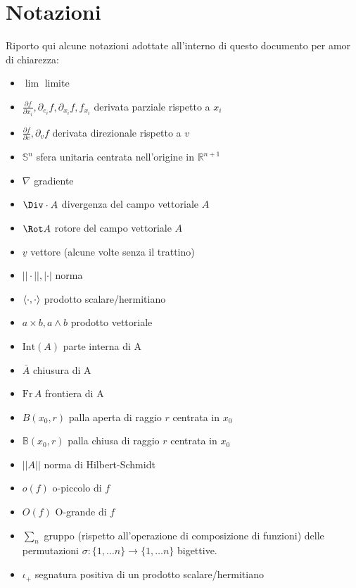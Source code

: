 \documentclass[12pt, twoside, italian]{book}
\begin{document}
	\chapter*{Notazioni}
	\pagestyle{empty}
	\thispagestyle{empty}
	\pagestyle{fancy}

	Riporto qui alcune notazioni adottate all'interno di questo documento per amor di chiarezza:
	\begin{itemize}[label=\hspace{-0.5em}]
		\item $\lim$ limite		
		\item $\frac{\partial f}{\partial x_i}, \partial_{e_i} f, \partial_{x_i} f, f_{x_i}$ derivata parziale rispetto a $x_i$
		\item $\frac{\partial f}{\partial v}, \partial_v f$ derivata direzionale rispetto a $v$
		\item $\mathbb{S}^{n}$ sfera unitaria centrata nell'origine in $\mathbb{R}^{n+1}$
		\item $\nabla$ gradiente
		\item $\Div \cdot A$ divergenza del campo vettoriale $A$
		\item $\Rot A$ rotore del campo vettoriale $A$
		\item $\underline{v}$ vettore (alcune volte senza il trattino)
		\item $||\cdot||, |\cdot|$ norma
		\item $\langle \cdot, \cdot \rangle$ prodotto scalare/hermitiano
		\item $a \times b, a \wedge b$ prodotto vettoriale
		\item $\text{Int}(A)$ parte interna di A
		\item $\bar{A}$ chiusura di A
		\item $\text{Fr} \, A$ frontiera di A
		\item $B(x_0, r)$ palla aperta di raggio $r$ centrata in $x_0$
		\item $\mathbb{B}(x_0, r)$ palla chiusa di raggio $r$ centrata in $x_0$
		\item $|| A ||$ norma di Hilbert-Schmidt
		\item $o(f)$ o-piccolo di $f$
		\item $O(f)$ O-grande di $f$
		\item $\sum_{n}$ gruppo (rispetto all'operazione di composizione di funzioni) delle permutazioni $\sigma: \{1, \ldots n \} \to \{1, \ldots n \}$ bigettive.
		\item $\iota_+$ segnatura positiva di un prodotto scalare/hermitiano

\end{itemize}
\end{document}
